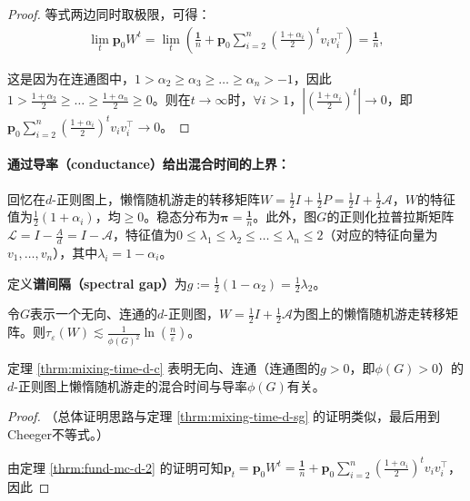 \documentclass[lang=cn,newtx,10pt,scheme=chinese,chinesefont=nofont,citestyle=gb7714-2015, bibstyle=gb7714-2015]{elegantbook}
\begin{document}
\begin{refsection}
\begin{proof}
    等式两边同时取极限，可得：
    \begin{align*}
        \lim_t \bm{p}_0W^t =\lim_t \left(\frac{\bm{1}}{n}+\bm{p}_0\sum_{i=2}^n{\left(\frac{1+\alpha_i}{2}\right)^tv_iv_i^{\top}}\right)=\frac{\bm{1}}{n},
    \end{align*}
    
    这是因为在连通图中，$1>\alpha_2\ge \alpha_3\ge \dots\ge \alpha_n>-1$，因此$1> \frac{1+\alpha_2}{2}\ge \dots\ge \frac{1+\alpha_n}{2}\ge 0$。则在$t\to \infty$时，$\forall i>1$，${|\left(\frac{1+\alpha_i}{2}\right)^t|}\to 0$，即$\bm{p}_0\sum_{i=2}^n{\left(\frac{1+\alpha_i}{2}\right)^tv_iv_i^{\top}}\to 0$。
\end{proof}

\paragraph{通过导率（conductance）给出混合时间的上界：}
                
回忆在$d$-正则图上，懒惰随机游走的转移矩阵$W=\frac{1}{2}I+\frac{1}{2}P=\frac{1}{2}I+\frac{1}{2}\mathcal{A}$，$W$的特征值为$\frac{1}{2}(1+\alpha_i)$，均$\ge 0$。稳态分布为$\bm{\pi}=\frac{\bm{1}}{n}$。此外，图$G$的正则化拉普拉斯矩阵$\mathcal{L}=I-\frac{A}{d}=I-\mathcal{A}$，特征值为$0\le\lambda_1\le \lambda_2\le\dots\le \lambda_n\le 2$（对应的特征向量为$v_1,\dots,v_n$），其中$\lambda_i=1-\alpha_i$。

定义\textbf{谱间隔（spectral gap）}为$g:=\frac{1}{2}(1-\alpha_2)=\frac{1}{2}\lambda_2$。

\begin{theorem}
    \label{thrm:mixing-time-d-c}
    令$G$表示一个无向、连通的$d$-正则图，$W=\frac{1}{2}I+\frac{1}{2}\mathcal{A}$为图上的懒惰随机游走转移矩阵。则$\tau_{\varepsilon}(W)\lesssim\frac{1}{\phi(G)^2}\ln{\left(\frac{n}{\varepsilon}\right)}$。
\end{theorem}

定理 \ref{thrm:mixing-time-d-c} 表明无向、连通（连通图的$g>0$，即$\phi(G)>0$）的$d$-正则图上懒惰随机游走的混合时间与导率$\phi(G)$有关。

\begin{proof}
    （总体证明思路与定理 \ref{thrm:mixing-time-d-sg} 的证明类似，最后用到Cheeger不等式。）

    由定理 \ref{thrm:fund-mc-d-2} 的证明可知$\bm{p}_t=\bm{p}_0W^t=\frac{\bm{1}}{n}+\bm{p}_0\sum_{i=2}^n{\left(\frac{1+\alpha_i}{2}\right)^tv_iv_i^{\top}}$，因此


\end{proof}
\end{refsection}
\end{document}
